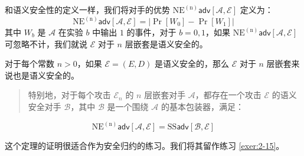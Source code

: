 和语义安全性的定义一样，我们将对手的优势 $\mathrm{NE^{(n)}}\mathsf{adv}[\mathcal{A},\mathcal{E}]$ 定义为：
\[
\mathrm{NE^{(n)}}\mathsf{adv}[\mathcal{A},\mathcal{E}]=\big\vert\Pr[W_0]-\Pr[W_1]\big\vert
\]
其中 $W_b$ 是 $\mathcal{A}$ 在实验 $b$ 中输出 $1$ 的事件，对于 $b=0,1$，如果 $\mathrm{NE^{(n)}}\mathsf{adv}[\mathcal{A},\mathcal{E}]$ 可忽略不计，我们就说 $\mathcal{E}$ 对于 $n$ 层嵌套是语义安全的。

\begin{theorem}
对于每个常数 $n>0$，如果 $\mathcal{E}=(E,D)$ 是语义安全的，那么 $\mathcal{E}$ 对于 $n$ 层嵌套来说也是语义安全的。
\begin{quote}
特别地，对于每个攻击 $\mathcal{E}_n$ 的 $n$ 层嵌套对手 $\mathcal{A}$，都存在一个攻击 $\mathcal{E}$ 的语义安全对手 $\mathcal{B}$，其中 $\mathcal{B}$ 是一个围绕 $\mathcal{A}$ 的基本包装器，满足：
\end{quote}
\[
\mathrm{NE^{(n)}}\mathsf{adv}[\mathcal{A},\mathcal{E}]=\mathrm{SS}\mathsf{adv}[\mathcal{B},\mathcal{E}]
\]
\end{theorem}

\noindent
这个定理的证明很适合作为安全归约的练习。我们将其留作练习 \ref{exer:2-15}。